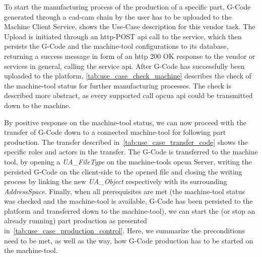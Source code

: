 \documentclass[
a4paper,
twoside,
headsepline,
cleardoublepage=empty,
parskip=half,
draft=false
]{scrbook}
\begin{document}
				To start the manufacturing process of the production of a specific part, G-Code generated through a \gls{cad}-\gls{cam} chain by the user has to be uploaded to the Machine Client Service.  shows the Use-Case description for this vendor task. The Upload is initiated through an \gls{http}-POST \gls{api} call to the service, which then persists the G-Code and the machine-tool configurations to its database, returning a success message in form of an \gls{http} 200 OK response to the vendor or services in general, calling the service \gls{api}.
				After G-Code has successfully been uploaded to the platform, \cref{tab:use_case_check_machine} describes the check of the machine-tool status for further manufacturing processes. The check is described more abstract, as every supported call \gls{opcua} \gls{api} could be transmitted down to the machine.
				
				By positive response on the machine-tool status, we can now proceed with the transfer of G-Code down to a connected machine-tool for following part production. The transfer described in~\cref{tab:use_case_transfer_code} shows the specific roles and actors in the transfer. The G-Code is transferred to the machine tool, by opening a \textit{UA\_FileType} on the machine-tools \gls{opcua} Server, writing the persisted G-Code on the client-side to the opened file and closing the writing process by linking the new \textit{UA\_Object} respectively with its surrounding \textit{AddressSpace}.
				Finally, when all prerequisites are met (the machine-tool status was checked and the machine-tool is available, G-Code has been persisted to the platform and transferred down to the machine-tool), we can start the (or stop an already running) part production as presented in~\cref{tab:use_case_production_control}. Here, we summarize the preconditions need to be met, as well as the way, how G-Code production has to be started on the machine-tool.
				
\end{document}
